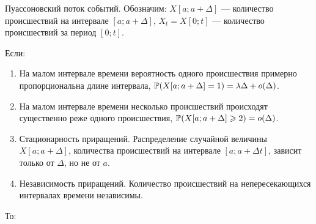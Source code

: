 \documentclass[12pt, a4paper]{article}
\begin{document}

\newpage

Пуассоновский поток событий. Обозначим: $X[a;a+\Delta]$ — количество  происшествий на интервале $[a;a+\Delta]$, $X_t=X[0;t]$ — количество происшествий за период $[0;t]$.

Если:
\begin{enumerate}
\item На малом интервале времени вероятность одного происшествия примерно пропорциональна длине интервала, $\P(X[a;a+\Delta]=1)=\lambda \Delta + o(\Delta)$.
\item На малом интервале времени несколько происшествий происходят существенно реже одного происшествия, $\P(X[a;a+\Delta] \geq 2)= o(\Delta)$.
\item Стационарность приращений. Распределение случайной величины $X[a;a+\Delta]$, количества происшествий на интервале $[a;a+\Delta t]$, зависит только от $\Delta$, но не от $a$.
\item Независимость приращений. Количество происшествий на непересекающихся интервалах времени независимы.
\end{enumerate}
То:
\end{document}
